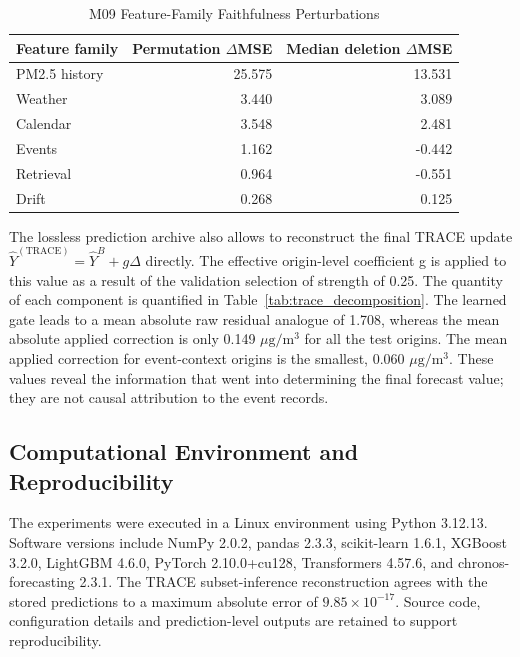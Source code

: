 \documentclass{ieeeaccess}
\begin{document}
\begin{table}[!t]
\centering
\caption{M09 Feature-Family Faithfulness Perturbations}
\label{tab:faithfulness}
\begin{tabular}{lrr}
\toprule
Feature family & Permutation $\Delta$MSE & Median deletion $\Delta$MSE \\
\midrule
PM2.5 history & 25.575 & 13.531 \\
Weather & 3.440 & 3.089 \\
Calendar & 3.548 & 2.481 \\
Events & 1.162 & -0.442 \\
Retrieval & 0.964 & -0.551 \\
Drift & 0.268 & 0.125 \\
\bottomrule
\end{tabular}
\end{table}

The lossless prediction archive also allows to reconstruct the final TRACE update $\hat{Y}^{(\mathrm{TRACE})} = \hat{Y}^{B} + g\Delta$ directly. The effective origin-level coefficient g is applied to this value as a result of the validation selection of strength of 0.25. The quantity of each component is quantified in Table~\ref{tab:trace_decomposition}. The learned gate leads to a mean absolute raw residual analogue of 1.708, whereas the mean absolute applied correction is only 0.149 $\mu\mathrm{g}/\mathrm{m}^3$ for all the test origins. The mean applied correction for event-context origins is the smallest, 0.060 $\mu\mathrm{g}/\mathrm{m}^3$. These values reveal the information that went into determining the final forecast value; they are not causal attribution to the event records.

\subsection{Computational Environment and Reproducibility}
The experiments were executed in a Linux environment using Python 3.12.13. Software versions include NumPy 2.0.2, pandas 2.3.3, scikit-learn 1.6.1, XGBoost 3.2.0, LightGBM 4.6.0, PyTorch 2.10.0+cu128, Transformers 4.57.6, and chronos-forecasting 2.3.1. The TRACE subset-inference reconstruction agrees with the stored predictions to a maximum absolute error of $9.85 \times 10^{-17}$. Source code, configuration details and prediction-level outputs are retained to support reproducibility.
\end{document}
